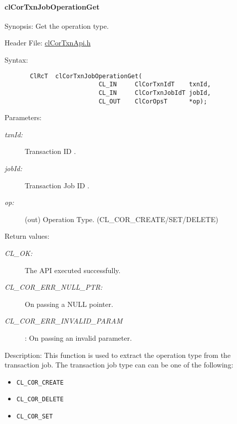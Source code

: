 \hypertarget{pagecor509}{}\paragraph{cl\-Cor\-Txn\-Job\-Operation\-Get}\label{pagecor509}
\begin{Desc}
\item[Synopsis:]Get the operation type.\end{Desc}
\begin{Desc}
\item[Header File:]\hyperlink{cl_cor_txn_api_8h}{cl\-Cor\-Txn\-Api.h}\end{Desc}
\begin{Desc}
\item[Syntax:]

\footnotesize\begin{verbatim}       ClRcT  clCorTxnJobOperationGet(
                          CL_IN     ClCorTxnIdT    txnId,
                          CL_IN     ClCorTxnJobIdT jobId,
                          CL_OUT    ClCorOpsT      *op);
\end{verbatim}
\normalsize
\end{Desc}
\begin{Desc}
\item[Parameters:]
\begin{description}
\item[{\em txn\-Id:}]Transaction ID . \item[{\em job\-Id:}]Transaction Job ID . \item[{\em op:}](out) Operation Type. {\tt }(CL\_\-COR\_\-CREATE/SET/DELETE)\end{description}
\end{Desc}
\begin{Desc}
\item[Return values:]
\begin{description}
\item[{\em CL\_\-OK:}]The API executed successfully. \item[{\em CL\_\-COR\_\-ERR\_\-NULL\_\-PTR:}]On passing a NULL pointer. \item[{\em CL\_\-COR\_\-ERR\_\-INVALID\_\-PARAM}]: On passing an invalid parameter.\end{description}
\end{Desc}
\begin{Desc}
\item[Description:]This function is used to extract the operation type from the transaction job. The transaction job type can can be one of the following: \begin{itemize}
\item {\tt CL\_\-COR\_\-CREATE} \item {\tt CL\_\-COR\_\-DELETE} \item {\tt CL\_\-COR\_\-SET} \end{itemize}
\end{Desc}
